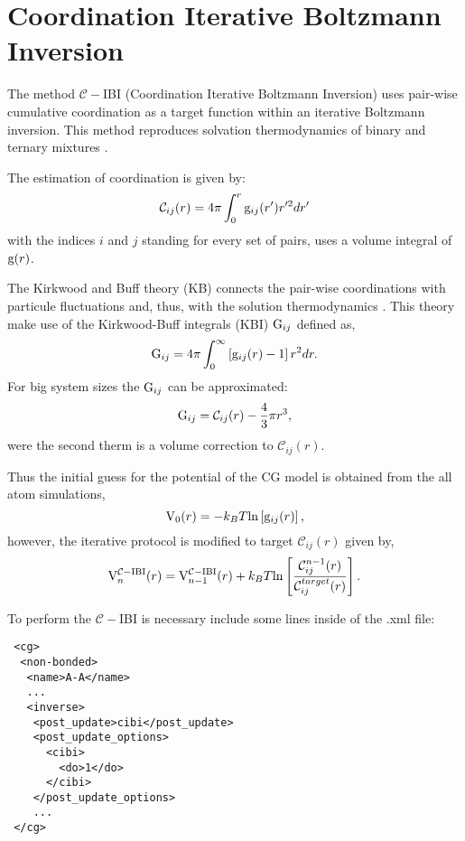 \section{Coordination Iterative Boltzmann Inversion}

The method $\mathcal{C}-$IBI (Coordination Iterative Boltzmann Inversion)
uses pair-wise cumulative coordination as a target function within an
iterative Boltzmann inversion. This method reproduces solvation thermodynamics
of binary and ternary mixtures \cite{deOliveira:2016}.

The estimation of coordination is given by:
\begin{equation}
\label{eq:coord}
\mathcal{C}_{ij}(r) = 4\pi \int_{0}^{r} {\rm g}_{ij}(r')r'^{2}dr'
\end{equation}
with the indices $i$ and $j$ standing for every set of pairs, uses a volume
integral of ${\rm g}(r)$.

The Kirkwood and Buff theory (KB) \cite{Kirkwood:1951} connects the pair-wise coordinations with
particule fluctuations and, thus, with the solution thermodynamics \cite{Mukherji:2013,Naim:2006}.
This theory make use of the Kirkwood-Buff integrals (KBI) ${\rm G}_{ij}$ defined as,
\begin{equation}
\label{eq:Gij}
{\rm G}_{ij} = 4 \pi \int_{0}^{\infty} \left [ {\rm g}_{ij}(r) - 1 \right ] r^{2} dr.
\end{equation}
For big system sizes the ${\rm G}_{ij}$ can be approximated:
\begin{equation}
\label{eq:Gij_app}
{\rm G}_{ij} = \mathcal{C}_{ij}(r) - \frac{4}{3} \pi r^{3},
\end{equation}
were the second therm is a volume correction to $\mathcal{C}_{ij}(r)$.

Thus the initial guess for the potential of the CG model is obtained from the all atom
simulations,
\begin{equation}
\label{eq:pot_ibi}
{\rm V}_{0}(r) = -k_{B}T {\rm ln} \left [ {\rm g}_{ij}(r) \right ],
\end{equation}
however, the iterative protocol is modified to target $\mathcal{C}_{ij}(r)$ given by,
\begin{equation}
\label{eq:pot_cibi}
{\rm V}_{n}^{\mathcal{C}-{\rm IBI}}(r) = {\rm V}_{n-1}^{\mathcal{C}-{\rm IBI}}(r)
+ k_{B}T {\rm ln} \left [ \frac{\mathcal{C}_{ij}^{n-1}(r)}{\mathcal{C}_{ij}^{target}(r)} \right ].
\end{equation}

To perform the $\mathcal{C}-$IBI is necessary include some lines inside of the .xml file:
\begin{lstlisting}
 <cg>
  <non-bonded>
   <name>A-A</name>
   ...
   <inverse>
    <post_update>cibi</post_update>
    <post_update_options>
      <cibi>
        <do>1</do>
      </cibi>
    </post_update_options>
    ...
 </cg>
\end{lstlisting}
